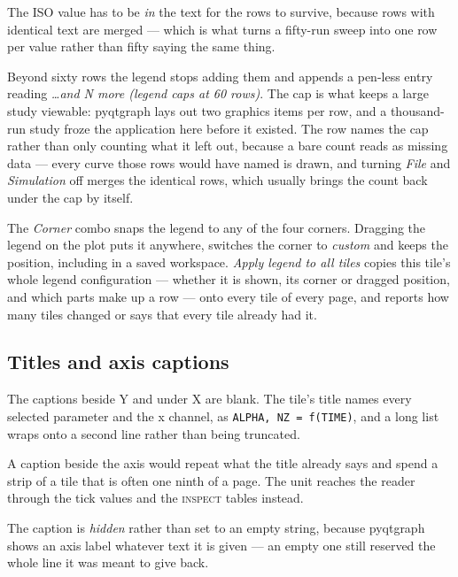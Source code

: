 \documentclass[11pt,a4paper,oneside]{report}
\newcommand{\code}[1]{\texttt{#1}}
\newcommand{\tab}[1]{\textsc{#1}}
\begin{document}
The ISO value has to be \emph{in} the text for the rows to survive, because
rows with identical text are merged --- which is what turns a fifty-run sweep
into one row per value rather than fifty saying the same thing.

Beyond sixty rows the legend stops adding them and appends a pen-less entry
reading \emph{\ldots and N more (legend caps at 60 rows)}. The cap is what
keeps a large study viewable: pyqtgraph lays out two graphics items per row, and
a thousand-run study froze the application here before it existed. The row names
the cap rather than only counting what it left out, because a bare count reads
as missing data --- every curve those rows would have named is drawn, and
turning \emph{File} and \emph{Simulation} off merges the identical rows, which
usually brings the count back under the cap by itself.

The \emph{Corner} combo snaps the legend to any of the four corners. Dragging the
legend on the plot puts it anywhere, switches the corner to \emph{custom} and
keeps the position, including in a saved workspace. \emph{Apply legend to all
tiles} copies this tile's whole legend configuration --- whether it is shown, its
corner or dragged position, and which parts make up a row --- onto every tile of
every page, and reports how many tiles changed or says that every tile already
had it.

\subsection{Titles and axis captions}

The captions beside Y and under X are blank. The tile's title names every
selected parameter and the x channel, as \code{ALPHA, NZ = f(TIME)}, and a long
list wraps onto a second line rather than being truncated.

A caption beside the axis would repeat what the title already says and spend a
strip of a tile that is often one ninth of a page. The unit reaches the reader
through the tick values and the \tab{inspect} tables instead.

The caption is \emph{hidden} rather than set to an empty string, because
pyqtgraph shows an axis label whatever text it is given --- an empty one still
reserved the whole line it was meant to give back.
\end{document}
